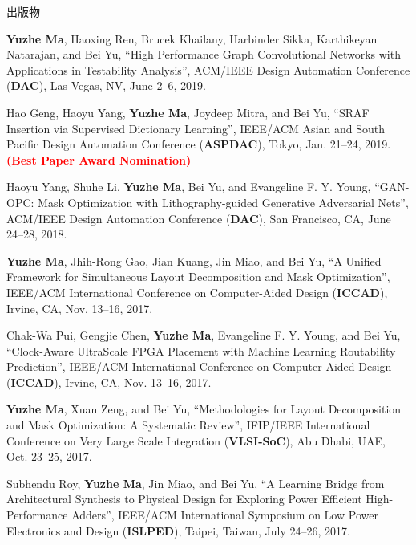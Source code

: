 \begin{rSection}{出版物}
\begin{description}[font=\normalfont]
\item[{[C7]}]{
    \textbf{Yuzhe Ma}, Haoxing Ren, Brucek Khailany, Harbinder Sikka, Karthikeyan Natarajan, and Bei Yu,
    ``High Performance Graph Convolutional Networks with Applications in Testability Analysis'',
    ACM/IEEE Design Automation Conference (\textbf{DAC}), Las Vegas, NV, June 2--6, 2019.
}

\item[{[C6]}]{
    Hao Geng, Haoyu Yang, \textbf{Yuzhe Ma}, Joydeep Mitra, and Bei Yu,
    ``SRAF Insertion via Supervised Dictionary Learning'',
    IEEE/ACM Asian and South Pacific Design Automation Conference (\textbf{ASPDAC}), Tokyo, Jan. 21--24, 2019. \textbf{\textcolor{red}{(Best Paper Award Nomination)}}
}

\item[{[C5]}]{
    Haoyu Yang, Shuhe Li, \textbf{Yuzhe Ma}, Bei Yu, and Evangeline F. Y. Young,
    ``GAN-OPC: Mask Optimization with Lithography-guided Generative Adversarial Nets'',
    ACM/IEEE Design Automation Conference (\textbf{DAC}), San Francisco, CA, June 24--28, 2018.
}

\item[{[C4]}]{
    \textbf{Yuzhe Ma}, Jhih-Rong Gao, Jian Kuang, Jin Miao, and Bei Yu,
    ``A Unified Framework for Simultaneous Layout Decomposition and Mask Optimization'',
    IEEE/ACM International Conference on Computer-Aided Design (\textbf{ICCAD}), Irvine, CA, Nov. 13--16, 2017.
}

\item[{[C3]}]{
    Chak-Wa Pui, Gengjie Chen, \textbf{Yuzhe Ma}, Evangeline F. Y. Young, and Bei Yu,
    ``Clock-Aware UltraScale FPGA Placement with Machine Learning Routability Prediction'',
    IEEE/ACM International Conference on Computer-Aided Design (\textbf{ICCAD}), Irvine, CA, Nov. 13--16, 2017.
}

\item[{[C2]}]{
    \textbf{Yuzhe Ma}, Xuan Zeng, and Bei Yu,
    ``Methodologies for Layout Decomposition and Mask Optimization: A Systematic Review'',
    IFIP/IEEE International Conference on Very Large Scale Integration (\textbf{VLSI-SoC}), Abu Dhabi, UAE, Oct. 23--25, 2017. %
}

\item[{[C1]}]{
    Subhendu Roy, \textbf{Yuzhe Ma}, Jin Miao, and Bei Yu,
    ``A Learning Bridge from Architectural Synthesis to Physical Design for Exploring Power Efficient High-Performance Adders'',
    IEEE/ACM International Symposium on Low Power Electronics and Design (\textbf{ISLPED}), Taipei, Taiwan, July 24--26, 2017.
}
\end{description}


\end{rSection}

